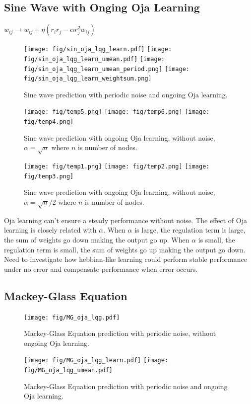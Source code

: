 \documentclass[12pt, a4paper]{article}
\begin{document}
\newpage

\subsection*{Sine Wave with Onging Oja Learning}

$w_{ij} \rightarrow w_{ij} + \eta (r_i r_j - \alpha r_j^2 w_{ij})$

\begin{figure}[H]
    \centering
    \texttt{[image: fig/sin\_oja\_lqg\_learn.pdf]}
    \texttt{[image: fig/sin\_oja\_lqg\_learn\_umean.pdf]}
    \texttt{[image: fig/sin\_oja\_lqg\_learn\_umean\_period.png]}
    \texttt{[image: fig/sin\_oja\_lqg\_learn\_weightsum.png]}
    \caption{Sine wave prediction with periodic noise and ongoing Oja learning.}
    \label{fig:2}
\end{figure}

\begin{figure}[H]
    \centering
    \texttt{[image: fig/temp5.png]}
    \texttt{[image: fig/temp6.png]}
    \texttt{[image: fig/temp4.png]}
    \caption{Sine wave prediction with ongoing Oja learning, without noise, $\alpha=\sqrt{n}$ where $n$ is number of nodes.}
    \label{fig:3}
\end{figure}

\begin{figure}[H]
    \centering
    \texttt{[image: fig/temp1.png]}
    \texttt{[image: fig/temp2.png]}
    \texttt{[image: fig/temp3.png]}
    \caption{Sine wave prediction with ongoing Oja learning, without noise, $\alpha=\sqrt{n}/2$ where $n$ is number of nodes.}
    \label{fig:3}
\end{figure}

Oja learning can't ensure a steady performance without noise. The effect of Oja learning is closely related with $\alpha$. When $\alpha$ is large, the regulation term is large, the sum of weights go down making the output go up. When $\alpha$ is small, the regulation term is small, the sum of weights go up making the output go down. Need to investigate how hebbian-like learning could perform stable performance under no error and compensate performance when error occurs.

\newpage

\subsection*{Mackey-Glass Equation}

\begin{figure}[H]
    \centering
    \texttt{[image: fig/MG\_oja\_lqg.pdf]}
    \caption{Mackey-Glass Equation prediction with periodic noise, without ongoing Oja learning.}
    \texttt{[image: fig/MG\_oja\_lqg\_learn.pdf]}
    \texttt{[image: fig/MG\_oja\_lqg\_umean.pdf]}
    \caption{Mackey-Glass Equation prediction with periodic noise and ongoing Oja learning.}
    \label{fig:4}
\end{figure}
\end{document}

